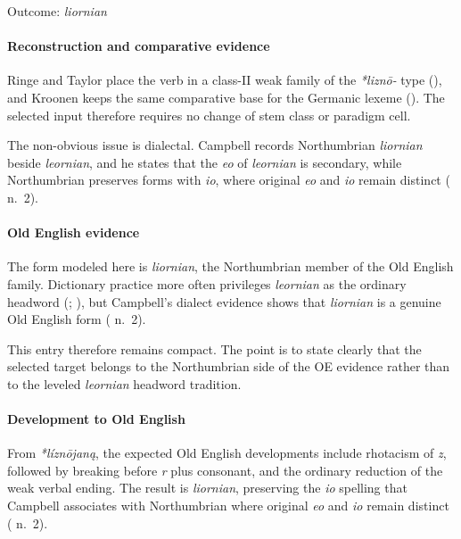 \documentclass[
  british,
  a4paper,
]{article}
\begin{document}
Outcome: \emph{liornian}

\paragraph{Reconstruction and comparative
evidence}\label{reconstruction-and-comparative-evidence-7}

Ringe and Taylor place the verb in a class-II weak family of the
\emph{*liznō-} type (), and Kroonen keeps the same comparative base for the Germanic
lexeme (). The selected input
therefore requires no change of stem class or paradigm cell.

The non-obvious issue is dialectal. Campbell records Northumbrian
\emph{liornian} beside \emph{leornian}, and he states that the \emph{eo}
of \emph{leornian} is secondary, while Northumbrian preserves forms with
\emph{io}, where original \emph{eo} and \emph{io} remain distinct
( n.~2).

\paragraph{Old English evidence}\label{old-english-evidence-7}

The form modeled here is \emph{liornian}, the Northumbrian member of the
Old English family. Dictionary practice more often privileges
\emph{leornian} as the ordinary headword
(;
), but Campbell's
dialect evidence shows that \emph{liornian} is a genuine Old English
form ( n.~2).

This entry therefore remains compact. The point is to state clearly that
the selected target belongs to the Northumbrian side of the OE evidence
rather than to the leveled \emph{leornian} headword tradition.

\paragraph{Development to Old
English}\label{development-to-old-english-7}

From \emph{*líznōjaną}, the expected Old English developments include
rhotacism of \emph{z}, followed by breaking before \emph{r} plus
consonant, and the ordinary reduction of the weak verbal ending. The
result is \emph{liornian}, preserving the \emph{io} spelling that
Campbell associates with Northumbrian where original \emph{eo} and
\emph{io} remain distinct ( n.~2).
\end{document}
